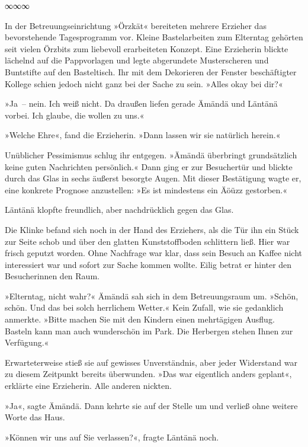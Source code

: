 \begin{center}
∞∞∞
\end{center}

In der Betreuungseinrichtung »Örzkät« bereiteten mehrere Erzieher das bevorstehende Tagesprogramm vor. Kleine Bastelarbeiten zum Elterntag gehörten seit vielen Örzbits zum liebevoll erarbeiteten Konzept. Eine Erzieherin blickte lächelnd auf die Pappvorlagen und legte abgerundete Musterscheren und Buntstifte auf den Basteltisch. Ihr mit dem Dekorieren der Fenster beschäftigter Kollege schien jedoch nicht ganz bei der Sache zu sein. »Alles okay bei dir?«

»Ja~– nein. Ich weiß nicht. Da draußen liefen gerade Ämändä und Läntänä vorbei. Ich glaube, die wollen zu uns.«

»Welche Ehre«, fand die Erzieherin. »Dann lassen wir sie natürlich herein.«

Unüblicher Pessimismus schlug ihr entgegen. »Ämändä überbringt grundsätzlich keine guten Nachrichten persönlich.« Dann ging er zur Besuchertür und blickte durch das Glas in sechs äußerst besorgte Augen. Mit dieser Bestätigung wagte er, eine konkrete Prognose anzustellen: »Es ist mindestens ein Äöüzz gestorben.«

Läntänä klopfte freundlich, aber nachdrücklich gegen das Glas. 

Die Klinke befand sich noch in der Hand des Erziehers, als die Tür ihn ein Stück zur Seite schob und über den glatten Kunststoffboden schlittern ließ. Hier war frisch geputzt worden. Ohne Nachfrage war klar, dass sein Besuch an Kaffee nicht interessiert war und sofort zur Sache kommen wollte. Eilig betrat er hinter den Besucherinnen den Raum.

»Elterntag, nicht wahr?« Ämändä sah sich in dem Betreuungsraum um. »Schön, schön. Und das bei solch herrlichem Wetter.« Kein Zufall, wie sie gedanklich anmerkte. »Bitte machen Sie mit den Kindern einen mehrtägigen Ausflug. Basteln kann man auch wunderschön im Park. Die Herbergen stehen Ihnen zur Verfügung.«

Erwarteterweise stieß sie auf gewisses Unverständnis, aber jeder Widerstand war zu diesem Zeitpunkt bereits überwunden. »Das war eigentlich anders geplant«, erklärte eine Erzieherin. Alle anderen nickten.

»Ja«, sagte Ämändä. Dann kehrte sie auf der Stelle um und verließ ohne weitere Worte das Haus.

»Können wir uns auf Sie verlassen?«, fragte Läntänä noch.

